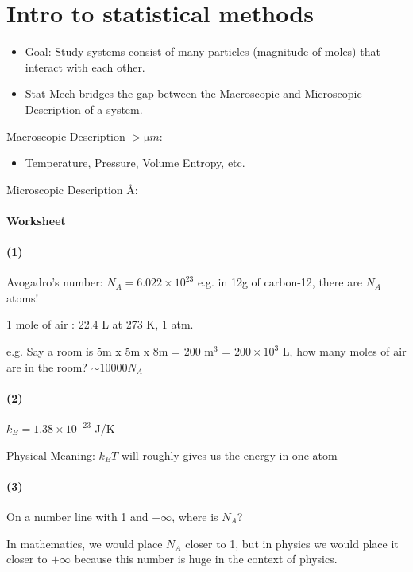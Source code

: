 \documentclass[../main.tex]{subfiles}
\begin{document}
\pagestyle{fancy}

\section{Intro to statistical methods}
\barh \vspace*{1em}

\begin{itemize}
    \item Goal: Study systems consist of many particles (magnitude of moles) that interact with each other.
    \item Stat Mech bridges the gap between the Macroscopic and Microscopic Description of a system.
\end{itemize}
Macroscopic Description $>\unit{\micro m}$:
\begin{itemize}
    \item Temperature, Pressure, Volume Entropy, etc.
\end{itemize}
Microscopic Description $\unit{\angstrom}$:

\paragraph*{Worksheet}
\paragraph*{(1)}
Avogadro's number: $N_A = 6.022 \times 10^{23}$ e.g. in 12g of carbon-12, there are $N_A$ atoms!

1 mole of air : 22.4 L at 273 K, 1 atm.

e.g. Say a room is 5m x 5m x 8m = 200 m\(^3\) = \(200 \times 10^3\) L, how many moles of air are in the room?
\(\sim 10000 N_A\)

\paragraph*{(2)}
\(k_B = 1.38 \times 10^{-23}\) J/K

Physical Meaning: \(k_B T\) will roughly gives us the energy in one atom

\paragraph*{(3)}
On a number line with 1 and $+\infty$, where is $N_A$?

In mathematics, we would place $N_A$ closer to 1, but in physics we would place it closer
to $+\infty$ because this number is huge in the context of physics.
\end{document}
